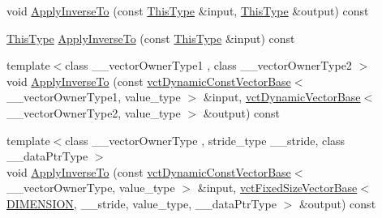 \begin{DoxyCompactItemize}
\item 
void \hyperlink{classvct_matrix_rotation3_const_base_a90a8b49af7a9689a7f3a1917702d59fc}{Apply\-Inverse\-To} (const \hyperlink{classvct_matrix_rotation3_const_base_ad26bf016ce37ea0532e1ce0aa7bba8a0}{This\-Type} \&input, \hyperlink{classvct_matrix_rotation3_const_base_ad26bf016ce37ea0532e1ce0aa7bba8a0}{This\-Type} \&output) const 
\item 
\hyperlink{classvct_matrix_rotation3_const_base_ad26bf016ce37ea0532e1ce0aa7bba8a0}{This\-Type} \hyperlink{classvct_matrix_rotation3_const_base_a800f192ecd7bc5c5b6d2930b2546ab84}{Apply\-Inverse\-To} (const \hyperlink{classvct_matrix_rotation3_const_base_ad26bf016ce37ea0532e1ce0aa7bba8a0}{This\-Type} \&input) const 
\item 
{\footnotesize template$<$class \-\_\-\-\_\-vector\-Owner\-Type1 , class \-\_\-\-\_\-vector\-Owner\-Type2 $>$ }\\void \hyperlink{classvct_matrix_rotation3_const_base_a397a9e47a592fdd1249fa2f577f8fc17}{Apply\-Inverse\-To} (const \hyperlink{classvct_dynamic_const_vector_base}{vct\-Dynamic\-Const\-Vector\-Base}$<$ \-\_\-\-\_\-vector\-Owner\-Type1, value\-\_\-type $>$ \&input, \hyperlink{classvct_dynamic_vector_base}{vct\-Dynamic\-Vector\-Base}$<$ \-\_\-\-\_\-vector\-Owner\-Type2, value\-\_\-type $>$ \&output) const 
\item 
{\footnotesize template$<$class \-\_\-\-\_\-vector\-Owner\-Type , stride\-\_\-type \-\_\-\-\_\-stride, class \-\_\-\-\_\-data\-Ptr\-Type $>$ }\\void \hyperlink{classvct_matrix_rotation3_const_base_af1252a1e416a9b633d1eea893a5b92a9}{Apply\-Inverse\-To} (const \hyperlink{classvct_dynamic_const_vector_base}{vct\-Dynamic\-Const\-Vector\-Base}$<$ \-\_\-\-\_\-vector\-Owner\-Type, value\-\_\-type $>$ \&input, \hyperlink{classvct_fixed_size_vector_base}{vct\-Fixed\-Size\-Vector\-Base}$<$ \hyperlink{classvct_matrix_rotation3_const_base_a6bc9712dde55ee3fca0d7880feb6a903afdf02f4ad230d81f0ca2539c7feb61f3}{D\-I\-M\-E\-N\-S\-I\-O\-N}, \-\_\-\-\_\-stride, value\-\_\-type, \-\_\-\-\_\-data\-Ptr\-Type $>$ \&output) const 
\item 

\end{DoxyCompactItemize}
